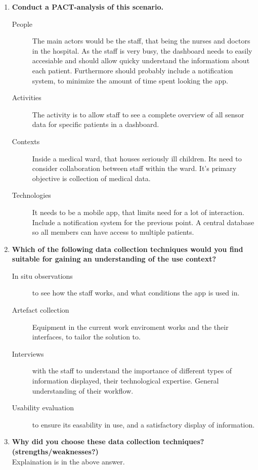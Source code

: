 \begin{enumerate}
    \item \textbf{Conduct a PACT-analysis of this scenario.}
    \begin{description}
        \item[People] The main actors would be the staff, that being the nurses and doctors in the hospital. As the staff is very busy, the dashboard needs to easily accesiable and should allow quicky understand the informatiom about each patient. Furthermore should probably include a notification system, to minimize the amount of time spent looking the app.
        \item[Activities] The activity is to allow staff to see a complete overview of all sensor data for specific patients in a dashboard.
        \item[Contexts] Inside a medical ward, that houses seriously ill children. Its need to consider collaboration between staff within the ward. It's primary objective is collection of medical data.
        \item[Technologies] It needs to be a mobile app, that limits need for a lot of interaction. Include a notification system for the previous point. A central database so all members can have access to multiple patients.
    \end{description}
    \item \textbf{Which of the following data collection techniques would you find suitable for gaining an understanding of the use context? }
    \begin{description}
        \item[In situ observations] to see how the staff works, and what conditions the app is used in. 
        \item[Artefact collection] Equipment in the current work enviroment works and the their interfaces, to tailor the solution to.
        \item[Interviews] with the staff to understand the importance of different types of information displayed, their technological expertise. General understanding of their workflow.
        \item[Usability evaluation] to ensure its easability in use, and a satisfactory display of information. 
    \end{description}
    \item \textbf{Why did you choose these data collection techniques? (strengths/weaknesses?)}\\
    Explaination is in the above answer.

\end{enumerate}
